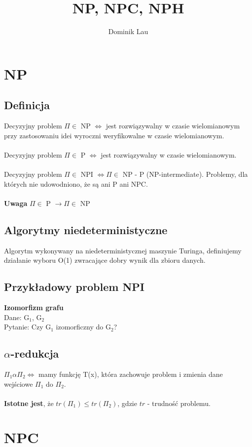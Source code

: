 \documentclass{article}
\title{NP, NPC, NPH}
\author{Dominik Lau}
\begin{document}
\maketitle

\section{NP}
\subsection{Definicja}
Decyzyjny problem $\Pi \in$ NP $\iff$ jest rozwiązywalny w czasie wielomianowym przy zastosowaniu idei wyroczni weryfikowalne w czasie wielomianowym. \\\\
Decyzyjny problem $\Pi \in$ P $\iff$ jest rozwiązywalny w czasie wielomianowym. \\\\
Decyzyjny problem $\Pi \in$ NPI $\iff \Pi \in$ NP - P (NP-intermediate).  Problemy, dla których nie udowodniono, że są ani P ani NPC.\\\\
\textbf{Uwaga}
$\Pi \in$ P $\rightarrow \Pi \in$ NP 

\subsection{Algorytmy niedeterministyczne}
Algorytm wykonywany na niedeterministycznej maszynie Turinga, definiujemy działanie wyboru O(1)
zwracające dobry wynik dla zbioru danych.

\subsection{Przykładowy problem NPI}
\textbf{Izomorfizm grafu} \\
Dane: G$_1$, G$_2$ \\
Pytanie: Czy G$_1$ izomorficzny do G$_2$?

\subsection{$\alpha$-redukcja}
$\Pi_1 \alpha \Pi_2 \iff$  mamy funkcję T(x), która zachowuje problem i 
zmienia dane wejściowe $\Pi_1$ do $\Pi_2$. \\\\
\textbf{Istotne jest}, że $tr(\Pi_1) \leq tr(\Pi_2)$, gdzie $tr$ - trudność problemu.

\section{NPC}
\end{document}

